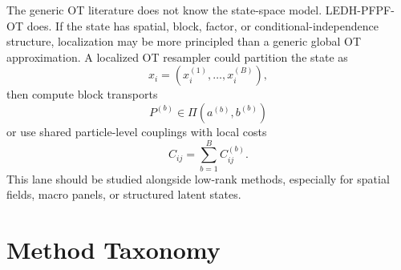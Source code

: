 \documentclass[11pt]{article}
\begin{document}
The generic OT literature does not know the state-space model.  LEDH-PFPF-OT
does.  If the state has spatial, block, factor, or conditional-independence
structure, localization may be more principled than a generic global OT
approximation.  A localized OT resampler could partition the state as
\begin{equation}
x_i=(x_i^{(1)},\ldots,x_i^{(B)}),
\label{eq:block-state}
\end{equation}
then compute block transports
\begin{equation}
P^{(b)}\in\Pi(a^{(b)},b^{(b)})
\label{eq:block-transport}
\end{equation}
or use shared particle-level couplings with local costs
\begin{equation}
C_{ij}
=
\sum_{b=1}^B C_{ij}^{(b)}.
\label{eq:block-cost}
\end{equation}
This lane should be studied alongside low-rank methods, especially for spatial
fields, macro panels, or structured latent states.

\section{Method Taxonomy}
\end{document}
